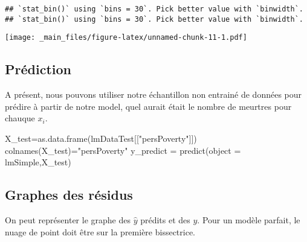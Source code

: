 \documentclass[
]{book}
\newenvironment{Shaded}{\begin{snugshade}}{\end{snugshade}}
\newcommand{\AttributeTok}[1]{\textcolor[rgb]{0.77,0.63,0.00}{#1}}
\newcommand{\FunctionTok}[1]{\textcolor[rgb]{0.00,0.00,0.00}{#1}}
\newcommand{\NormalTok}[1]{#1}
\newcommand{\OtherTok}[1]{\textcolor[rgb]{0.56,0.35,0.01}{#1}}
\newcommand{\StringTok}[1]{\textcolor[rgb]{0.31,0.60,0.02}{#1}}
\begin{document}
\begin{verbatim}
## `stat_bin()` using `bins = 30`. Pick better value with `binwidth`.
## `stat_bin()` using `bins = 30`. Pick better value with `binwidth`.
\end{verbatim}

\texttt{[image: \_main\_files/figure-latex/unnamed-chunk-11-1.pdf]}

\hypertarget{pruxe9diction}{%
\subsection*{Prédiction}\label{pruxe9diction}}

A présent, nous pouvons utiliser notre échantillon non entrainé de données pour prédire à partir de notre model, quel aurait était le nombre de meurtres pour chauque \(x_i\).\\

\begin{Shaded}
\begin{Highlighting}[]
\NormalTok{X\_test}\OtherTok{=}\FunctionTok{as.data.frame}\NormalTok{(lmDataTest[[}\StringTok{"persPoverty"}\NormalTok{]])}
\FunctionTok{colnames}\NormalTok{(X\_test)}\OtherTok{=}\StringTok{"persPoverty"}
\NormalTok{y\_predict }\OtherTok{=} \FunctionTok{predict}\NormalTok{(}\AttributeTok{object =}\NormalTok{ lmSimple,X\_test)}
\end{Highlighting}
\end{Shaded}

\hypertarget{graphes-des-ruxe9sidus}{%
\subsection*{Graphes des résidus}\label{graphes-des-ruxe9sidus}}

On peut représenter le graphe des \(\hat y\) prédits et des \(y\). Pour un modèle parfait, le nuage de point doit être sur la première bissectrice.\\
\end{document}
